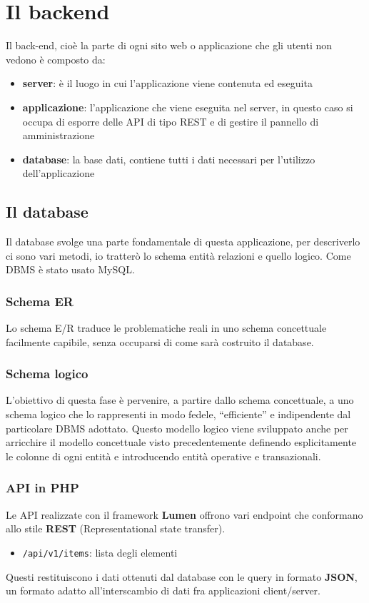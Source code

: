 \documentclass[12pt]{article}
\begin{document}
\section{Il backend}
Il back-end, cioè la parte di ogni sito web o applicazione che gli utenti non vedono è composto da:
\begin{itemize}
    \item \textbf{server}: è il luogo in cui l'applicazione viene contenuta ed eseguita
    \item \textbf{applicazione}: l'applicazione che viene eseguita nel server, in questo caso si occupa di esporre delle API di tipo REST e di gestire il pannello di amministrazione
    \item \textbf{database}: la base dati, contiene tutti i dati necessari per l'utilizzo dell'applicazione  
\end{itemize}

\subsection{Il database}

Il database svolge una parte fondamentale di questa applicazione, per descriverlo ci sono vari metodi, io tratterò lo schema entità relazioni e quello logico. Come DBMS è stato usato MySQL.

\subsubsection{Schema ER}
Lo schema E/R traduce le problematiche reali in uno  schema concettuale facilmente capibile, senza occuparsi di come sarà costruito il database.


\subsubsection{Schema logico}
L’obiettivo di questa fase è pervenire, a partire dallo schema concettuale, a uno schema logico che
lo rappresenti in modo fedele, “efficiente” e indipendente dal particolare DBMS adottato. Questo modello logico viene sviluppato anche per arricchire il modello concettuale visto precedentemente definendo esplicitamente le colonne di ogni entità e introducendo entità operative e transazionali.

\subsubsection{API in PHP}
Le API realizzate con il framework \textbf{Lumen} offrono vari endpoint che conformano allo stile \textbf{REST} (Representational state transfer).
\begin{itemize}
    \item \verb+/api/v1/items+: lista degli elementi
\end{itemize}
Questi restituiscono i dati ottenuti dal database con le query in formato \textbf{JSON}, un formato adatto all'interscambio di dati fra applicazioni client/server.
\end{document}
